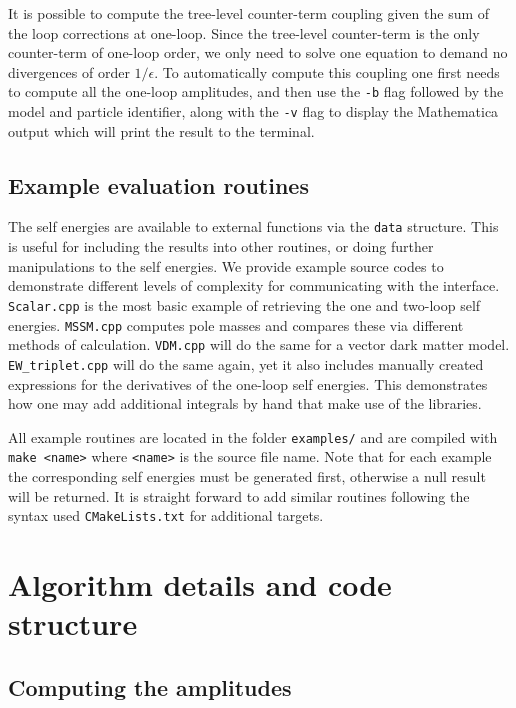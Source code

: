 It is possible to compute the tree-level counter-term coupling given the sum of the loop corrections at one-loop.  Since the tree-level counter-term is the only counter-term of one-loop order, we only need to solve one equation to demand no divergences of order $1/\epsilon$.  To automatically compute this coupling one first needs to compute all the one-loop amplitudes, and then use the \lstinline{-b} flag followed by the model and particle identifier, along with the \lstinline{-v} flag to display the Mathematica output which will print the result to the terminal.

\subsection{Example evaluation routines}

The self energies are available to external functions via the \lstinline{data} structure.  This is useful for including the results into other routines, or doing further manipulations to the self energies.  We provide example source codes to demonstrate different levels of complexity for communicating with the \tsil interface.  \lstinline{Scalar.cpp} is the most basic example of retrieving the one and two-loop self energies.  \lstinline{MSSM.cpp} computes pole masses and compares these via different methods of calculation.  \lstinline{VDM.cpp} will do the same for a vector dark matter model.  \lstinline{EW_triplet.cpp} will do the same again, yet it also includes manually created expressions for the derivatives of the one-loop self energies.  This demonstrates how one may add additional integrals by hand that make use of the \tsil libraries.

All example routines are located in the folder \lstinline{examples/} and are compiled with \lstinline{make <name>} where \lstinline{<name>} is the source file name.  Note that for each example the corresponding self energies must be generated first, otherwise a null result will be returned.  It is straight forward to add similar routines following the syntax used \lstinline{CMakeLists.txt} for additional targets.



\section{Algorithm details and code structure}

\subsection{Computing the amplitudes}\label{sec:amplitudes}

